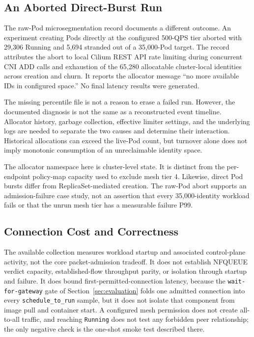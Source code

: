 \documentclass[letterpaper,twocolumn,10pt]{article}
\begin{document}
\subsection{An Aborted Direct-Burst Run}
The raw-Pod microsegmentation record documents a different outcome.
An experiment creating Pods directly at the configured 500-QPS tier
aborted with 29,306 Running and 5,694 stranded out of a 35,000-Pod
target. The record attributes the abort to local Cilium REST API
rate limiting during concurrent CNI ADD calls and exhaustion of the
65,280 allocatable cluster-local identities across creation and churn.
It reports the allocator message ``no more available IDs in configured
space.'' No final latency results were generated.

The missing percentile file is not a reason to erase a failed run.
However, the documented diagnosis is not the same as a reconstructed
event timeline. Allocator history, garbage collection, effective limiter
settings, and the underlying logs are needed to separate the two causes
and determine their interaction. Historical allocations can exceed the
live-Pod count, but turnover alone does not imply monotonic consumption
of an unreclaimable identity space.

The allocator namespace here is cluster-level state. It is distinct
from the per-endpoint policy-map capacity used to exclude mesh tier 4.
Likewise, direct Pod bursts differ from ReplicaSet-mediated creation.
The raw-Pod abort supports an admission-failure case study, not an
assertion that every 35,000-identity workload fails or that the unrun
mesh tier has a measurable failure P99.

\subsection{Connection Cost and Correctness}
The available collection measures workload startup and associated
control-plane activity, not the core packet-admission tradeoff. It does
not establish NFQUEUE verdict capacity, established-flow throughput
parity, or isolation through startup and failure. It does bound
first-permitted-connection latency, because the \texttt{wait-for-gateway}
gate of Section~\ref{sec:evaluation} folds one admitted connection into
every \texttt{schedule\_to\_run} sample, but it does not isolate that
component from image pull and container start. A configured mesh
permission does not create all-to-all traffic, and reaching
\texttt{Running} does not test any forbidden peer relationship; the
only negative check is the one-shot smoke test described there.
\end{document}
